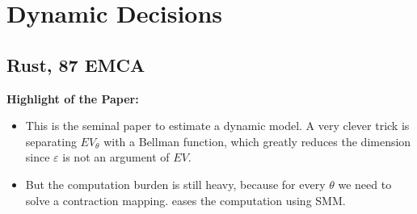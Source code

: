 \documentclass{book}
\theoremstyle{plain}
\theoremstyle{definition}
\begin{document}


\chapter{Dynamic Decisions} %
\label{cha:dynamic_decisions}

\section{Rust, 87 EMCA} %
\label{sec:rust_87_emca}

\textbf{}

\vspace{1em}
\noindent
\textbf{Highlight of the Paper:}
\begin{itemize}
	\item This is the seminal paper to estimate a dynamic model.
	A very clever trick is separating $EV_\theta$ with a Bellman function, which greatly reduces the dimension since $\varepsilon$ is not an argument of $EV$.

	\item But the computation burden is still heavy, because for every $\theta$ we need to solve a contraction mapping. \cite{Hotz:1993ea} eases the computation using SMM.
\end{itemize}
\end{document}
